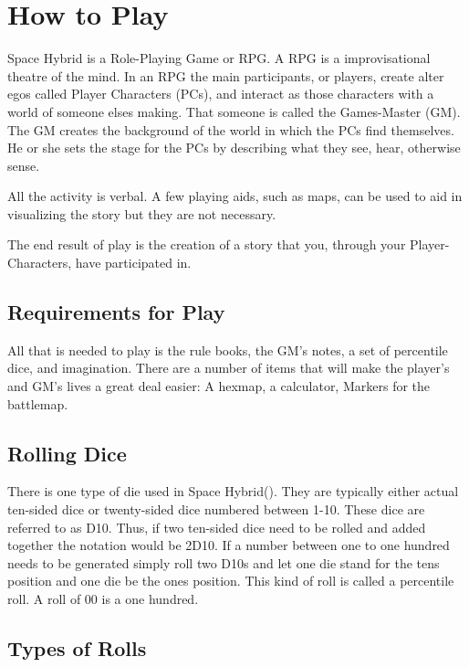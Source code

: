 \chapter{How to Play}

Space Hybrid is a Role-Playing Game or RPG. A RPG is a improvisational theatre 
of the mind. In an RPG the main participants, or players, create alter egos called
Player Characters (PCs), and interact as those characters with a world of someone
elses making. That someone is called the Games-Master (GM). The GM creates the 
background of the world in which the PCs find themselves. He or she sets 
the stage for the PCs by describing what they see, hear, otherwise sense. 

All the activity is verbal. A few playing aids, such as maps, can be used 
to aid in visualizing the story but they are not necessary. 

The end result of play is the creation of a story that you, through
your Player-Characters, have participated in. 

\section{Requirements for Play}

All that is needed to play is the rule books, the GM's notes, 
a set of percentile dice, and imagination. There are a number of items that 
will make the player's and GM's lives a great deal easier: 
A hexmap, a calculator, Markers for the battlemap.

\section{Rolling Dice}

There is one type of die used in Space Hybrid(\SH). They are
typically either actual ten-sided dice or twenty-sided dice 
numbered between 1-10. These dice are referred to as D10. Thus,
if two ten-sided dice need to be rolled and added together the 
notation would be 2D10. If a number between one to one hundred needs
to be generated simply roll two D10s and let one die stand for the 
tens position and one die be the ones position. This kind of roll is 
called a percentile roll. A roll of 00 is a one hundred. 

\section{Types of Rolls}

